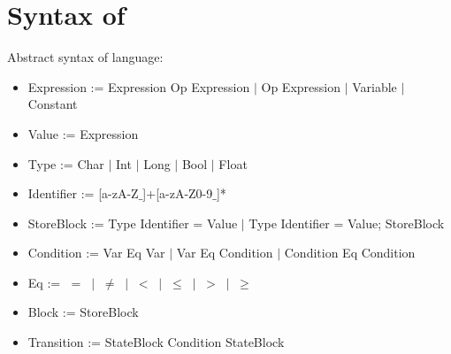 \section{Syntax of \plcchart}

Abstract syntax of \plcchart language:
\begin{definition}
\plcchart

\begin{itemize}
	\item Expression := Expression Op Expression $\mid$ Op Expression $\mid$ Variable $\mid$ Constant
	\item Value := Expression
	\item Type := Char $\mid$ Int $\mid$ Long $\mid$ Bool $\mid$ Float
	\item Identifier := [a-zA-Z$\_$]+[a-zA-Z0-9$\_$]*  
	
	\item StoreBlock := Type Identifier = Value $\mid$ Type Identifier = Value; StoreBlock

	\item Condition := Var Eq Var $\mid$ Var Eq Condition $\mid$ Condition Eq Condition
	
	\item Eq := $\; = \; \mid \; \neq \; \mid \; < \; \mid \; \leq \; \mid \; > \; \mid \; \geq$	

	\item Block := StoreBlock	
	
	\item Transition := StateBlock Condition StateBlock
\end{itemize}
\end{definition}

